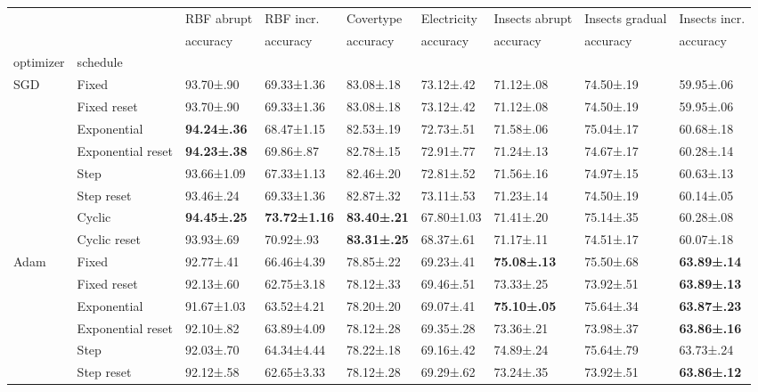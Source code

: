 \begin{tabular}{lllllllll}
\toprule
 &  & RBF abrupt & RBF incr. & Covertype & Electricity & Insects abrupt & Insects gradual & Insects incr. \\
 &  & accuracy & accuracy & accuracy & accuracy & accuracy & accuracy & accuracy \\
optimizer & schedule &  &  &  &  &  &  &  \\
\midrule
\multirow[c]{8}{*}{SGD} & Fixed & 93.70±.90 & 69.33±1.36 & 83.08±.18 & 73.12±.42 & 71.12±.08 & 74.50±.19 & 59.95±.06 \\
 & Fixed reset & 93.70±.90 & 69.33±1.36 & 83.08±.18 & 73.12±.42 & 71.12±.08 & 74.50±.19 & 59.95±.06 \\
 & Exponential & \bfseries 94.24±.36 & 68.47±1.15 & 82.53±.19 & 72.73±.51 & 71.58±.06 & 75.04±.17 & 60.68±.18 \\
 & Exponential reset & \bfseries 94.23±.38 & 69.86±.87 & 82.78±.15 & 72.91±.77 & 71.24±.13 & 74.67±.17 & 60.28±.14 \\
 & Step & 93.66±1.09 & 67.33±1.13 & 82.46±.20 & 72.81±.52 & 71.56±.16 & 74.97±.15 & 60.63±.13 \\
 & Step reset & 93.46±.24 & 69.33±1.36 & 82.87±.32 & 73.11±.53 & 71.23±.14 & 74.50±.19 & 60.14±.05 \\
 & Cyclic & \bfseries 94.45±.25 & \bfseries 73.72±1.16 & \bfseries 83.40±.21 & 67.80±1.03 & 71.41±.20 & 75.14±.35 & 60.28±.08 \\
 & Cyclic reset & 93.93±.69 & 70.92±.93 & \bfseries 83.31±.25 & 68.37±.61 & 71.17±.11 & 74.51±.17 & 60.07±.18 \\
\multirow[c]{8}{*}{Adam} & Fixed & 92.77±.41 & 66.46±4.39 & 78.85±.22 & 69.23±.41 & \bfseries 75.08±.13 & 75.50±.68 & \bfseries 63.89±.14 \\
 & Fixed reset & 92.13±.60 & 62.75±3.18 & 78.12±.33 & 69.46±.51 & 73.33±.25 & 73.92±.51 & \bfseries 63.89±.13 \\
 & Exponential & 91.67±1.03 & 63.52±4.21 & 78.20±.20 & 69.07±.41 & \bfseries 75.10±.05 & 75.64±.34 & \bfseries 63.87±.23 \\
 & Exponential reset & 92.10±.82 & 63.89±4.09 & 78.12±.28 & 69.35±.28 & 73.36±.21 & 73.98±.37 & \bfseries 63.86±.16 \\
 & Step & 92.03±.70 & 64.34±4.44 & 78.22±.18 & 69.16±.42 & 74.89±.24 & 75.64±.79 & 63.73±.24 \\
 & Step reset & 92.12±.58 & 62.65±3.33 & 78.12±.28 & 69.29±.62 & 73.24±.35 & 73.92±.51 & \bfseries 63.86±.12 \\

\end{tabular}
